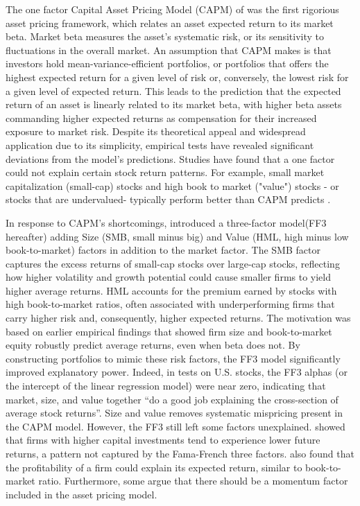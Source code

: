 The one factor Capital Asset Pricing Model (CAPM) of  was the first rigorious asset pricing framework, which relates an asset expected return to its market beta. Market beta measures the asset's systematic risk, or its sensitivity to fluctuations in the overall market. An assumption that CAPM makes is that investors hold mean-variance-efficient portfolios, or portfolios that offers the highest expected return for a given level of risk or, conversely, the lowest risk for a given level of expected return. This leads to the prediction that the expected return of an asset is linearly related to its market beta, with higher beta assets commanding higher expected returns as compensation for their increased exposure to market risk. Despite its theoretical appeal and widespread application due to its simplicity, empirical tests have revealed significant deviations from the model's predictions. Studies have found that a one factor could not explain certain stock return patterns. For example, small market capitalization (small-cap) stocks and high book to market ("value") stocks - or stocks that are undervalued- typically perform better than CAPM predicts \cite{capm_2004}.

In response to CAPM's shortcomings,  introduced a three-factor model(FF3 hereafter) adding Size (SMB, small minus big) and Value (HML, high minus low book-to-market) factors in addition to the market factor. The SMB factor captures the excess returns of small-cap stocks over large-cap stocks, reflecting how higher volatility and growth potential could cause smaller firms to yield higher average returns. HML accounts for the premium earned by stocks with high book-to-market ratios, often associated with underperforming firms that carry higher risk and, consequently, higher expected returns. The motivation was based on earlier empirical findings that showed firm size and book-to-market equity robustly predict average returns, even when beta does not. By constructing portfolios to mimic these risk factors, the FF3 model significantly improved explanatory power. Indeed, in tests on U.S. stocks, the FF3 alphas (or the intercept of the linear regression model) were near zero, indicating that market, size, and value together “do a good job explaining the cross-section of average stock returns”. Size and value removes systematic mispricing present in the CAPM model. However, the FF3 still left some factors unexplained.  showed that firms with higher capital investments tend to experience lower future returns, a pattern not captured by the Fama-French three factors.  also found that the profitability of a firm could explain its expected return, similar to book-to-market ratio. Furthermore, some argue that there should be a momentum factor included in the asset pricing model.

